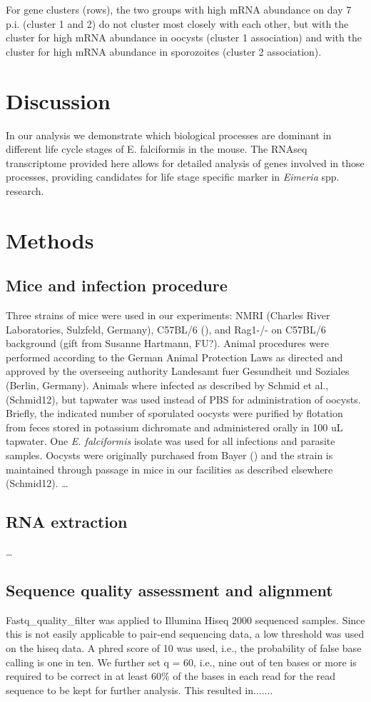 \documentclass{bmcart}
\begin{document}
For gene clusters (rows), the two groups with high mRNA abundance on day 7 p.i. (cluster 1 and 2)
do not cluster most closely with each other, but with the cluster for high mRNA abundance in oocysts
(cluster 1 association) and with the cluster for high mRNA abundance in sporozoites (cluster 2 
association).


\section*{Discussion}
In our analysis we demonstrate which biological processes are dominant in different
life cycle stages of E. falciformis in the mouse. The RNAseq transcriptome provided here 
allows for detailed analysis of genes involved in those processes, providing candidates for 
life stage specific marker in \textit{Eimeria} spp. research. 

\section*{Methods}
\subsection*{Mice and infection procedure}
Three strains of mice were used in our experiments: NMRI (Charles River Laboratories, Sulzfeld,
Germany), C57BL/6 (), and Rag1-/- on C57BL/6 background (gift from Susanne Hartmann, FU?). 
Animal procedures were performed according to the German Animal Protection Laws as 
directed and approved by the overseeing authority Landesamt fuer Gesundheit und Soziales 
(Berlin, Germany). Animals where infected as described by Schmid et al., (Schmid12), but
tapwater was used instead of PBS for administration of oocysts. Briefly, the indicated number of
sporulated oocysts were purified by flotation from feces stored in potassium dichromate and 
administered orally in 100 uL tapwater. One \textit{E. falciformis} isolate
was used for all infections and parasite samples. Oocysts were originally purchased from Bayer 
() and the strain is maintained through passage in mice  in our facilities as described 
elsewhere (Schmid12).
\ldots
\subsection*{RNA extraction}
 \ldots
\subsection*{Sequence quality assessment and alignment}
Fastq\_quality\_filter was applied to Illumina Hiseq 2000 sequenced samples. 
Since this is not easily applicable to pair-end sequencing data, a low threshold was 
used on the hiseq data. A phred score of 10 was used, i.e., the probability of false base 
calling is one in ten. We further set q = 60, i.e., nine out of ten bases
or more is required to be correct in at least 
60\% of the bases in each read for the read sequence to be kept for further analysis.
This resulted in.......
\end{document}

